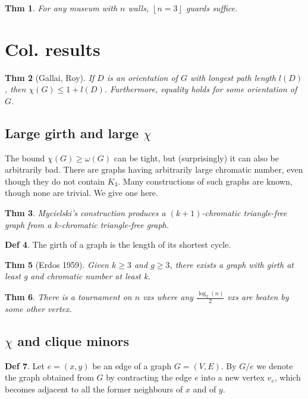 \documentclass[11pt, fleqn, a4paper, landscape]{article}
\theoremstyle{plain} %
\newtheorem{thm}{Thm}
\theoremstyle{remark} %
\theoremstyle{definition} %
\newtheorem{defi}[thm]{Def}
\begin{document}
\begin{multicols}{5}
\begin{thm}
For any museum with $n$ walls, $\left\lfloor n=3\right\rfloor$ guards suffice.
\end{thm}

\section{Col. results}
\begin{thm}[Gallai, Roy]
If $D$ is an orientation of $G$ with longest path length $l(D)$, then $\chi(G) \le 1 + l(D)$. Furthermore, equality holds for some orientation of $G$.
\end{thm} 

\subsection{Large girth and large $\chi$}

The bound $\chi(G) \ge \omega(G)$ can be tight, but (surprisingly) it can also be arbitrarily bad. There are graphs having arbitrarily large chromatic number, even though they do not contain $K_3$. Many constructions of such graphs are known, though none are trivial. We give one here.
\addtocounter{thm}{1}
\begin{thm}
Mycielski’s construction produces a $(k + 1)$-chromatic triangle-free graph from a $k$-chromatic triangle-free graph.
\end{thm}

\begin{defi}
The girth of a graph is the length of its shortest cycle.
\end{defi}
\begin{thm}[Erdos 1959]
Given $k \ge 3$ and $g \ge 3$, there exists a graph with girth at least g and
chromatic number at least k.
\end{thm} 
\addtocounter{thm}{2}
\begin{thm}
There is a tournament on $n$ vxs where any $\frac{\log_2(n)}{2}$ vxs are beaten by some other vertex.
\end{thm}
\subsection{$\chi$ and clique minors}
\begin{defi}
Let $e = (x, y)$ be an edge of a graph $G = (V,E)$. By $G\slash e$ we denote the graph obtained from $G$ by contracting the edge $e$ into a new vertex $v_e$, which becomes adjacent to all the former neighbours of $x$ and of $y$. 


\end{defi}
\end{multicols}
\end{document}
